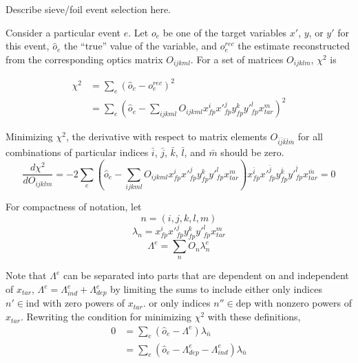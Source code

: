 Describe sieve/foil event selection here.


Consider a particular event $e$.
Let $o_e$ be one of the target variables $x'$, $y$, or $y'$ for this event,
$\hat{o}_e$ the ``true'' value of the variable,
and
$o^{rec}_e$ the estimate reconstructed
from the corresponding optics matrix $O_{ijkml}$.
For a set of matrices $O_{ijklm}$, $\chi^2$ is

\begin{align}
    \chi^2 &= \sum_e (\hat{o}_e - o^{rec}_e)^2 \\
           &= \sum_e \left( \hat{o}_e - \sum_{ijkml} O_{ijkml} x^i_{fp} x'^j_{fp} y^k_{fp} y'^l_{fp} x^m_{tar} \right)^2
\end{align}


Minimizing $\chi^2$, the derivative with respect to matrix elements
$O_{\bar{i}\bar{j}\bar{k}\bar{l}\bar{m}}$
for all combinations of particular indices
$\bar{i}$, $\bar{j}$, $\bar{k}$, $\bar{l}$, and $\bar{m}$
should be zero.
\begin{equation}
    \frac{d\chi^2}{dO_{ijklm}}
    = -2 \sum_e \left( \hat{o}_e - \sum_{ijkml} O_{ijkml} x^i_{fp} x'^j_{fp} y^k_{fp} y'^l_{fp} x^m_{tar} \right)
      x^{\bar{i}}_{fp} x'^{\bar{j}}_{fp} y^{\bar{k}}_{fp} y'^{\bar{l}}_{fp} x^{\bar{m}}_{tar}
    = 0
\end{equation}

For compactness of notation, let
\begin{equation} \label{eqn:index_abbreviation}
    n = (i,j,k,l,m)
\end{equation}
\begin{equation}
    \lambda_n = x^{i}_{fp} x'^{j}_{fp} y^{k}_{fp} y'^{l}_{fp} x^{m}_{tar}
\end{equation}
\begin{equation}
    \Lambda^e = \sum_n O_n \lambda^e_n
\end{equation}

Note that $\Lambda^e$ can be separated into parts that are dependent on and
independent of $x_{tar}$, $\Lambda^e = \Lambda^e_{ind} + \Lambda^e_{dep}$
by limiting the sums to include either
only indices $n'\in\text{ind}$ with zero powers of $x_{tar}$.
or
only indices $n''\in\text{dep}$ with nonzero powers of $x_{tar}$.
Rewriting the condition for minimizing $\chi^2$ with these definitions,
\begin{align}
    0 &= \sum_e (\hat{o}_e - \Lambda^e) \lambda_{\bar{n}} \\
      &= \sum_e (\hat{o}_e - \Lambda^e_{dep} - \Lambda^e_{ind}) \lambda_{\bar{n}}
\end{align}

